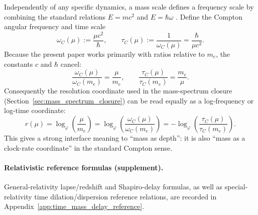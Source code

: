 Independently of any specific dynamics, a mass scale defines a frequency scale by combining the standard relations $E=mc^2$ and $E=\hbar\omega$ \cite{Einstein1905,NielsenChuang2010}.
Define the Compton angular frequency and time scale
\begin{equation}
\label{eq:compton_clock}
\omega_C(\mu):=\frac{\mu c^2}{\hbar},
\qquad
\tau_C(\mu):=\frac{1}{\omega_C(\mu)}=\frac{\hbar}{\mu c^2}.
\end{equation}
Because the present paper works primarily with ratios relative to $m_e$, the constants $c$ and $\hbar$ cancel:
\[
\frac{\omega_C(\mu)}{\omega_C(m_e)}=\frac{\mu}{m_e},
\qquad
\frac{\tau_C(\mu)}{\tau_C(m_e)}=\frac{m_e}{\mu}.
\]
Consequently the resolution coordinate used in the mass-spectrum closure (Section~\ref{sec:mass_spectrum_closure}) can be read equally as a log-frequency or log-time coordinate:
\begin{equation}
\label{eq:r_as_log_compton}
r(\mu)=\log_\varphi\!\left(\frac{\mu}{m_e}\right)
=\log_\varphi\!\left(\frac{\omega_C(\mu)}{\omega_C(m_e)}\right)
=-\log_\varphi\!\left(\frac{\tau_C(\mu)}{\tau_C(m_e)}\right).
\end{equation}
This gives a strong interface meaning to ``mass as depth'': it is also ``mass as a clock-rate coordinate'' in the standard Compton sense.

\paragraph{Relativistic reference formulas (supplement).}
General-relativity lapse/redshift and Shapiro-delay formulas, as well as special-relativity time dilation/dispersion reference relations, are recorded in Appendix~\ref{app:time_mass_delay_reference}.